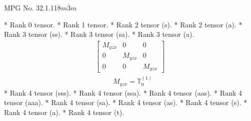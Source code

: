 \documentclass[fleqn,8pt,landscape]{jsarticle}
\begin{document}
\setcounter{MaxMatrixCols}{32}

\renewcommand{\tablename}{Table~}
\renewcommand{\figurename}{Figure~}
\begin{center}
\LARGE
MPG No. 32.1.118\quad$m\bar{3}m$
\end{center}
* Rank 0 tensor.
* Rank 1 tensor.
* Rank 2 tensor (s).
* Rank 2 tensor (a).
* Rank 3 tensor (ss).
* Rank 3 tensor (sa).
* Rank 3 tensor (a).
\begin{align*}
\begin{bmatrix} M_{yzx} & 0 & 0 \\ 0 & M_{yzx} & 0 \\ 0 & 0 & M_{yzx} \end{bmatrix}
\end{align*}
\begin{align*}
& M_{yzx} = \mathbb{T}_{0}^{(1)}
\end{align*}
* Rank 4 tensor (sss).
* Rank 4 tensor (ssa).
* Rank 4 tensor (aas).
* Rank 4 tensor (aaa).
* Rank 4 tensor (sa).
* Rank 4 tensor (as).
* Rank 4 tensor (s).
* Rank 4 tensor (a).
* Rank 4 tensor (t).
\end{document}
